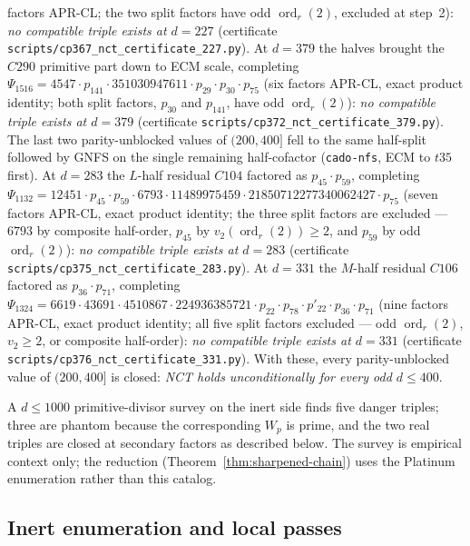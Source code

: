 \documentclass[11pt]{amsart}
\theoremstyle{plain}
\theoremstyle{definition}
\theoremstyle{remark}
\numberwithin{equation}{section}
\newcommand{\ord}{\operatorname{ord}}
\begin{document}
factors APR-CL; the two split factors have odd $\ord_r(2)$, excluded at step~2): \emph{no compatible triple exists at $d = 227$} (certificate \texttt{scripts/}\allowbreak\texttt{cp367\_nct\_certificate\_227.py}). At $d = 379$ the halves brought the $C290$ primitive part down to ECM scale, completing $\Psi_{1516} = 4547 \cdot p_{141} \cdot 351030947611 \cdot p_{29} \cdot p_{30} \cdot p_{75}$ (six factors APR-CL, exact product identity; both split factors, $p_{30}$ and $p_{141}$, have odd $\ord_r(2)$): \emph{no compatible triple exists at $d = 379$} (certificate \texttt{scripts/}\allowbreak\texttt{cp372\_nct\_certificate\_379.py}). The last two parity-unblocked values of $(200, 400]$ fell to the same half-split followed by GNFS on the single remaining half-cofactor (\texttt{cado-nfs}, ECM to $t35$ first). At $d = 283$ the $L$-half residual $C104$ factored as $p_{45} \cdot p_{59}$, completing $\Psi_{1132} = 12451 \cdot p_{45} \cdot p_{59} \cdot 6793 \cdot 11489975459 \cdot 21850712277340062427 \cdot p_{75}$ (seven factors APR-CL, exact product identity; the three split factors are excluded --- $6793$ by composite half-order, $p_{45}$ by $v_2(\ord_r(2)) \geq 2$, and $p_{59}$ by odd $\ord_r(2)$): \emph{no compatible triple exists at $d = 283$} (certificate \texttt{scripts/}\allowbreak\texttt{cp375\_nct\_certificate\_283.py}). At $d = 331$ the $M$-half residual $C106$ factored as $p_{36} \cdot p_{71}$, completing $\Psi_{1324} = 6619 \cdot 43691 \cdot 4510867 \cdot 224936385721 \cdot p_{22} \cdot p_{78} \cdot p'_{22} \cdot p_{36} \cdot p_{71}$ (nine factors APR-CL, exact product identity; all five split factors excluded --- odd $\ord_r(2)$, $v_2 \geq 2$, or composite half-order): \emph{no compatible triple exists at $d = 331$} (certificate \texttt{scripts/}\allowbreak\texttt{cp376\_nct\_certificate\_331.py}). With these, every parity-unblocked value of $(200, 400]$ is closed: \emph{NCT holds unconditionally for every odd $d \leq 400$}.

A $d\leq1000$ primitive-divisor survey on the inert side finds five danger triples; three are phantom because the corresponding $W_p$ is prime, and the two real triples are closed at secondary factors as described below. The survey is empirical context only; the reduction (Theorem~\ref{thm:sharpened-chain}) uses the Platinum enumeration rather than this catalog.

\subsection{Inert enumeration and local passes}\label{sec:inert-survey}\label{sec:secondary}
\end{document}

